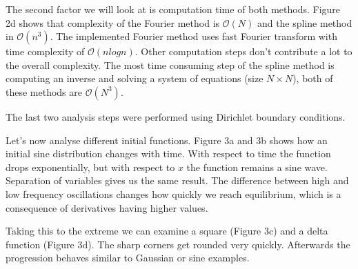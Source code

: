 \documentclass[12pt, a4paper]{article}
\begin{document}
The second factor we will look at is computation time of both methods. Figure 2d shows that complexity of the Fourier method is $\mathcal{O}(N)$ and the spline method in $\mathcal{O}(n^3)$. The implemented Fourier method uses fast Fourier transform with time complexity of $\mathcal{O}(nlogn)$. Other computation steps don't contribute a lot to the overall complexity. The most time consuming step of the spline method is computing an inverse and solving a system of equations (size $N \times N$), both of these methods are $\mathcal{O}(N^3)$. 

The last two analysis steps were performed using Dirichlet boundary conditions.

Let's now analyse different initial functions. Figure 3a and 3b shows how an initial sine distribution changes with time. With respect to time the function drops exponentially, but with respect to $x$ the function remains a sine wave. Separation of variables gives us the same result. The difference between high and low frequency oscillations changes how quickly we reach equilibrium, which is a consequence of derivatives having higher values.

Taking this to the extreme we can examine a square (Figure 3c) and a delta function (Figure 3d). The sharp corners get rounded very quickly. Afterwards the progression behaves similar to Gaussian or sine examples.
\end{document}
